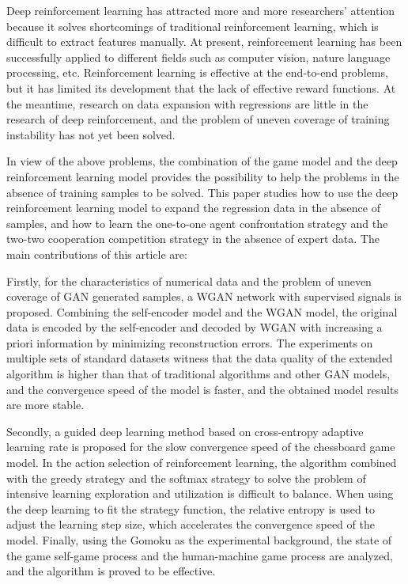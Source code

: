 \begin{englishabstract}
Deep reinforcement learning has attracted more and more researchers’ attention because it solves shortcomings of traditional reinforcement learning, which is difficult to extract features manually. At present, reinforcement learning has been successfully applied to different fields such as computer vision, nature language processing, etc. Reinforcement learning is effective at the end-to-end problems, but it has limited its development that the lack of effective reward functions. At the meantime, research on data expansion with regressions are little in the research of deep reinforcement, and the problem of uneven coverage of training instability has not yet been solved.

In view of the above problems, the combination of the game model and the deep reinforcement learning model provides the possibility to help the problems in the absence of training samples to be solved. This paper studies how to use the deep reinforcement learning model to expand the regression data in the absence of samples, and how to learn the one-to-one agent confrontation strategy and the two-two cooperation competition strategy in the absence of expert data. The main contributions of this article are:

Firstly, for the characteristics of numerical data and the problem of uneven coverage of GAN generated samples, a WGAN network with supervised signals is proposed. Combining the self-encoder model and the WGAN model, the original data is encoded by the self-encoder and decoded by WGAN with increasing a priori information by minimizing reconstruction errors. The experiments on multiple sets of standard datasets witness that the data quality of the extended algorithm is higher than that of traditional algorithms and other GAN models, and the convergence speed of the model is faster, and the obtained model results are more stable.

Secondly, a guided deep learning method based on cross-entropy adaptive learning rate is proposed for the slow convergence speed of the chessboard game model. In the action selection of reinforcement learning, the algorithm combined with the greedy strategy and the softmax strategy to solve the problem of intensive learning exploration and utilization is difficult to balance. When using the deep learning to fit the strategy function, the relative entropy is used to adjust the learning step size, which accelerates the convergence speed of the model. Finally, using the Gomoku as the experimental background, the state of the game self-game process and the human-machine game process are analyzed, and the algorithm is proved to be effective.


\end{englishabstract}
